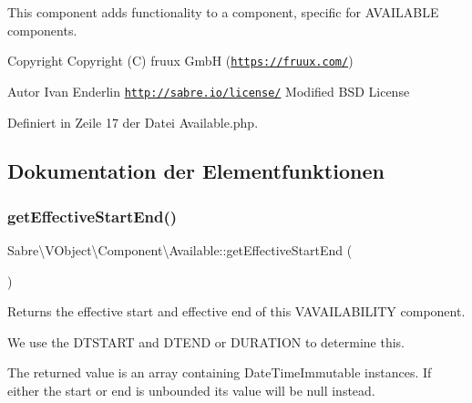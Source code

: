 This component adds functionality to a component, specific for A\+V\+A\+I\+L\+A\+B\+LE components.

\begin{DoxyCopyright}{Copyright}
Copyright (C) fruux GmbH (\href{https://fruux.com/}{\tt https\+://fruux.\+com/}) 
\end{DoxyCopyright}
\begin{DoxyAuthor}{Autor}
Ivan Enderlin  \href{http://sabre.io/license/}{\tt http\+://sabre.\+io/license/} Modified B\+SD License 
\end{DoxyAuthor}


Definiert in Zeile 17 der Datei Available.\+php.



\subsection{Dokumentation der Elementfunktionen}
\mbox{\label{class_sabre_1_1_v_object_1_1_component_1_1_available_a4590a817c682aa722c326ca1717f9266}} 
\subsubsection{\texorpdfstring{get\+Effective\+Start\+End()}{getEffectiveStartEnd()}}
{\footnotesize\ttfamily Sabre\textbackslash{}\+V\+Object\textbackslash{}\+Component\textbackslash{}\+Available\+::get\+Effective\+Start\+End (\begin{DoxyParamCaption}{ }\end{DoxyParamCaption})}

Returns the \textquotesingle{}effective start\textquotesingle{} and \textquotesingle{}effective end\textquotesingle{} of this V\+A\+V\+A\+I\+L\+A\+B\+I\+L\+I\+TY component.

We use the D\+T\+S\+T\+A\+RT and D\+T\+E\+ND or D\+U\+R\+A\+T\+I\+ON to determine this.

The returned value is an array containing Date\+Time\+Immutable instances. If either the start or end is \textquotesingle{}unbounded\textquotesingle{} its value will be null instead.

